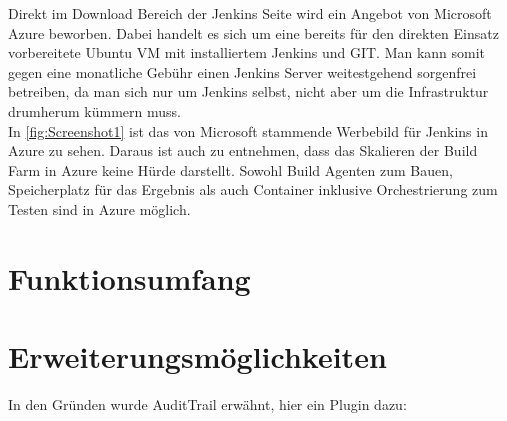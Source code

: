 Direkt im Download Bereich der Jenkins Seite wird ein Angebot von Microsoft Azure beworben. Dabei handelt es sich um eine bereits für den direkten Einsatz vorbereitete Ubuntu VM mit installiertem Jenkins und GIT. Man kann somit gegen eine monatliche Gebühr einen Jenkins Server weitestgehend sorgenfrei betreiben, da man sich nur um Jenkins selbst, nicht aber um die Infrastruktur drumherum kümmern muss. \cite{jenkins-azure}\\
In \autoref{fig:Screenshot1} ist das von Microsoft stammende Werbebild für Jenkins in Azure zu sehen. Daraus ist auch zu entnehmen, dass das Skalieren der Build Farm in Azure keine Hürde darstellt. Sowohl Build Agenten zum Bauen, Speicherplatz für das Ergebnis als auch Container inklusive Orchestrierung zum Testen sind in Azure möglich.
\section{Funktionsumfang}
\section{Erweiterungsmöglichkeiten}
In den Gründen wurde AuditTrail erwähnt, hier ein Plugin dazu: \cite{jenkins-audit-trail}
